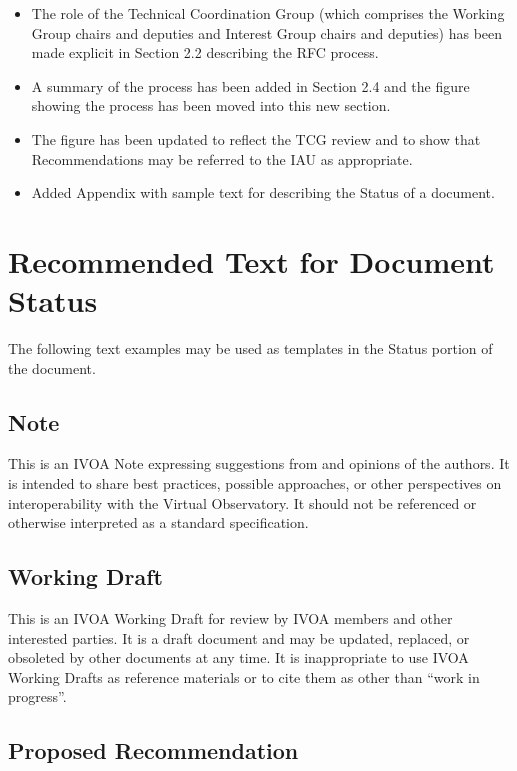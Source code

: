 \documentclass[11pt,a4paper]{ivoa}
\begin{document}
\begin{itemize}
\item  The role of the Technical Coordination Group (which comprises the
Working Group chairs and deputies and Interest Group chairs and
deputies) has been made explicit in Section 2.2 describing the RFC
process.

\item  A summary of the process has been added in Section 2.4 and the figure
showing the process has been moved into this new section.

\item  The figure has been updated to reflect the TCG review and to show
that Recommendations may be referred to the IAU as appropriate.

\item  Added Appendix with sample text for describing the Status of a document.
\end{itemize}

\section{Recommended Text for Document Status}
\label{app:statustexts}

The following text examples may be used as templates in the Status
portion of the document.

\subsection{Note}
This is an IVOA Note expressing suggestions from and opinions of the
authors. It is intended to share best practices, possible approaches, or
other perspectives on interoperability with the Virtual Observatory. It
should not be referenced or otherwise interpreted as a standard
specification.

\subsection{Working Draft}
This is an IVOA Working Draft for review by IVOA members and other
interested parties.  It is a draft document and may be updated,
replaced, or obsoleted by other documents at any time. It is
inappropriate to use IVOA Working Drafts as reference materials or to
cite them as other than “work in progress”.

\subsection{Proposed Recommendation}
\end{document}
